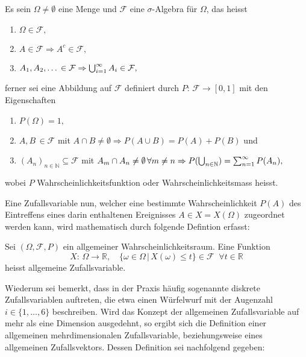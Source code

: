 \documentclass[a4paper,12pt]{article}
\renewcommand{\theenumi}{(\arabic{enumi})}
\renewcommand\labelenumi{\theenumi} %
\begin{document}
\begin{dn}\label{AllgemeinerWahrscheinlichkeitsraum}
Es sein $\Omega \neq \emptyset$ eine Menge und $\mathcal{F}$ eine $\sigma$-Algebra für $\Omega$, das heisst \begin{enumerate} 	
\item $\Omega \in \mathcal{F},$
\item $A \in \mathcal{F} \Rightarrow A^c \in \mathcal{F},$
\item $A_1,A_2,\dots \, \in \mathcal{F} \Rightarrow \bigcup\displaylimits_{i=1}^{\infty} A_i \in \mathcal{F},$
\end{enumerate} ferner sei eine Abbildung auf $\mathcal{F}$ definiert durch $P:\,\mathcal{F} \rightarrow [0,1]$ mit den Eigenschaften \begin{enumerate}
\renewcommand\theenumi{(\alph{enumi})}
\renewcommand\labelenumi{\theenumi}
\item $P(\Omega) = 1,$
\item $A,B \, \in \mathcal{F}$ mit $A\cap B \neq \emptyset \Rightarrow P(A\cup B) = P(A) + P(B)$ und
\item $(A_n)_{n \in \mathbb{N}} \subseteq \mathcal{F}$ mit $A_m \cap A_n \neq \emptyset \, \forall m \neq n \Rightarrow P(\bigcup\displaylimits_{n \in \mathbb{N}}) = \sum_{n=1}^{\infty}P(A_n),$
\end{enumerate} wobei $P$ Wahrscheinlichkeitsfunktion oder Wahrscheinlichkeitsmass heisst.
\end{dn}

Eine Zufallsvariable nun, welcher eine bestimmte Wahrscheinlichkeit $P(A)$ des Eintreffens eines darin enthaltenen Ereignisses $A \in X=X(\Omega)$ zugeordnet werden kann, wird mathematisch durch folgende Defintion erfasst:

\begin{dn}\label{AllgemeineZufallsvariable}
Sei $(\Omega,\mathcal{F},P)$ ein allgemeiner Wahrscheinlichkeitsraum. Eine Funktion \begin{equation}X:\,\Omega \rightarrow \mathbb{R}, \quad \{\omega \in \Omega\,|\,X(\omega) \leq t\} \in \mathcal{F}\;\; \forall t \in \mathbb{R}\end{equation} heisst allgemeine Zufallsvariable.
\end{dn}

Wiederum sei bemerkt, dass in der Praxis häufig sogenannte diskrete Zufallsvariablen auftreten, die etwa einen Würfelwurf mit der Augenzahl $i \in \{1,\dots,6\}$ beschreiben. Wird das Konzept der allgemeinen Zufallsvariable auf mehr als eine Dimension ausgedehnt, so ergibt sich die Definition einer allgemeinen mehrdimensionalen Zufallsvariable, beziehungsweise eines allgemeinen Zufallsvektors. Dessen Definition sei nachfolgend gegeben:
\end{document}
